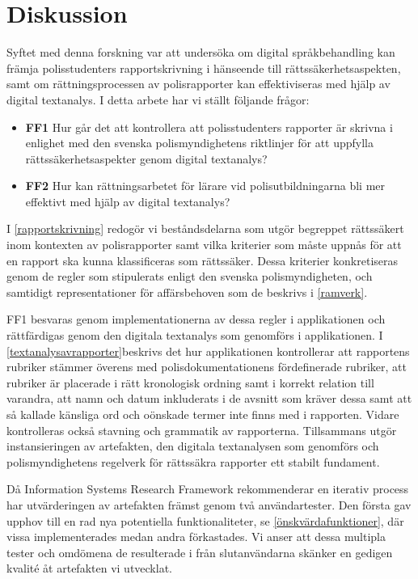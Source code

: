 \documentclass[swedish]{maucsthesis}
\begin{document}
\section{Diskussion}
Syftet med denna forskning var att undersöka om digital språkbehandling kan främja polisstudenters rapportskrivning i hänseende till rättssäkerhetsaspekten, samt om rättningsprocessen av polisrapporter kan effektiviseras med hjälp av digital textanalys. I detta arbete har vi ställt följande frågor:
\begin{itemize}
\item \textbf{FF1} Hur går det att kontrollera att polisstudenters rapporter är skrivna i enlighet med den svenska polismyndighetens riktlinjer för att uppfylla rättssäkerhetsaspekter genom digital textanalys?
\item \textbf{FF2} Hur kan rättningsarbetet för lärare vid polisutbildningarna bli mer effektivt med hjälp av digital textanalys?
\end{itemize}
I \cref{rapportskrivning} redogör vi beståndsdelarna som utgör begreppet rättssäkert inom kontexten av polisrapporter samt vilka kriterier som måste uppnås för att en rapport ska kunna klassificeras som rättssäker. Dessa kriterier konkretiseras genom de regler som stipulerats enligt den svenska polismyndigheten, och samtidigt representationer för affärsbehoven som de beskrivs i \cref{ramverk}.

FF1 besvaras genom implementationerna av dessa regler i applikationen och rättfärdigas genom den digitala textanalys som genomförs i applikationen. I  \cref{textanalysavrapporter}beskrivs det hur applikationen kontrollerar att rapportens rubriker stämmer överens med polisdokumentationens fördefinerade rubriker, att rubriker är placerade i rätt kronologisk ordning samt i korrekt relation till varandra, att namn och datum inkluderats i de avsnitt som kräver dessa samt att så kallade känsliga ord och oönskade termer inte finns med i rapporten. Vidare kontrolleras också stavning och grammatik av rapporterna. Tillsammans utgör instansieringen av artefakten, den digitala textanalysen som genomförs och polismyndighetens regelverk för rättssäkra rapporter ett stabilt fundament.

Då Information Systems Research Framework rekommenderar en iterativ process har utvärderingen av artefakten främst genom två användartester. Den första gav upphov till en rad nya potentiella funktionaliteter, se \cref{önskvärdafunktioner}, där vissa implementerades medan andra förkastades. Vi anser att dessa multipla tester och omdömena de resulterade i från slutanvändarna skänker en gedigen kvalité åt artefakten vi utvecklat. 
\end{document}
